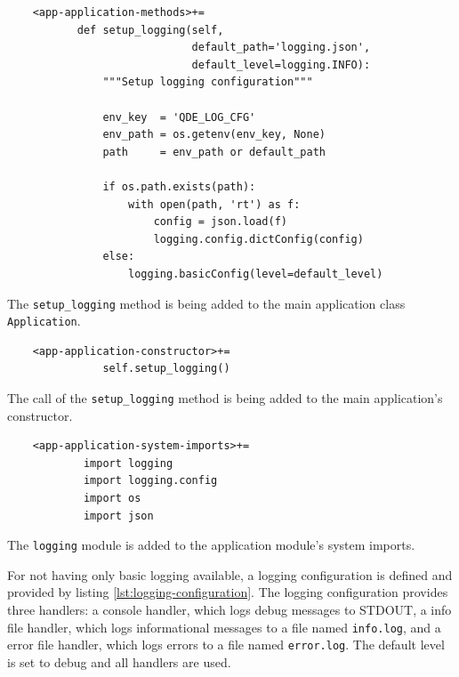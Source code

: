 \documentclass[10pt, openright, notitlepage]{scrreprt}
\begin{document}
\begin{listing}[H]
\begin{verbatim}
    <app-application-methods>+=
           def setup_logging(self,
                             default_path='logging.json',
                             default_level=logging.INFO):
               """Setup logging configuration"""
           
               env_key  = 'QDE_LOG_CFG'
               env_path = os.getenv(env_key, None)
               path     = env_path or default_path
           
               if os.path.exists(path):
                   with open(path, 'rt') as f:
                       config = json.load(f)
                       logging.config.dictConfig(config)
               else:
                   logging.basicConfig(level=default_level)
\end{verbatim}
\caption{\label{lst:app-application-methods-setup-logging}
The \texttt{setup\_logging} method is being added to the main application class \texttt{Application}.}
\end{listing}

\begin{listing}[H]
\begin{verbatim}
    <app-application-constructor>+=
               self.setup_logging()
\end{verbatim}
\caption{\label{lst:app-application-constructor-call-setup-logging}
The call of the \texttt{setup\_logging} method is being added to the main application's constructor.}
\end{listing}

\begin{listing}[H]
\begin{verbatim}
    <app-application-system-imports>+=
            import logging
            import logging.config
            import os
            import json
\end{verbatim}
\caption{\label{lst:app-application-system-imports-logging}
The \texttt{logging} module is added to the application module's system imports.}
\end{listing}

For not having only basic logging available, a logging configuration is defined
and provided by listing \ref{lst:logging-configuration}. The logging configuration
provides three handlers: a console handler, which logs debug messages to STDOUT,
a info file handler, which logs informational messages to a file named
\texttt{info.log}, and a error file handler, which logs errors to a file
named \texttt{error.log}. The default level is set to debug and all handlers
are used.
\end{document}
